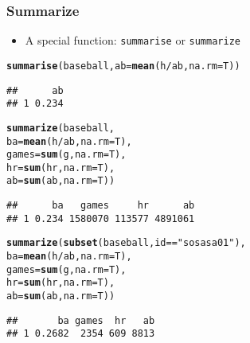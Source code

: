 \documentclass{beamer}\usepackage[]{graphicx}\usepackage[]{color}
\makeatletter
\newcommand{\hlstr}[1]{\textcolor[rgb]{0.192,0.494,0.8}{#1}}%
\newcommand{\hlopt}[1]{\textcolor[rgb]{0,0,0}{#1}}%
\newcommand{\hlstd}[1]{\textcolor[rgb]{0.345,0.345,0.345}{#1}}%
\newcommand{\hlkwc}[1]{\textcolor[rgb]{0.333,0.667,0.333}{#1}}%
\newcommand{\hlkwd}[1]{\textcolor[rgb]{0.737,0.353,0.396}{\textbf{#1}}}%
\newenvironment{kframe}{%
 \def\at@end@of@kframe{}%
 \ifinner\ifhmode%
  \def\at@end@of@kframe{\end{minipage}}%
  \begin{minipage}{\columnwidth}%
 \fi\fi%
 \def\FrameCommand##1{\hskip\@totalleftmargin \hskip-\fboxsep
 \colorbox{shadecolor}{##1}\hskip-\fboxsep
     \hskip-\linewidth \hskip-\@totalleftmargin \hskip\columnwidth}%
 \MakeFramed {\advance\hsize-\width
   \@totalleftmargin\z@ \linewidth\hsize
   \@setminipage}}%
 {\par\unskip\endMakeFramed%
 \at@end@of@kframe}
\newenvironment{knitrout}{}{} %
\makeatother
\begin{document}
\begin{frame}[fragile]
\frametitle{Summarize}
\begin{itemize}
\item A special function: \texttt{summarise} or \texttt{summarize}
\end{itemize}
\begin{knitrout}\scriptsize
{}\color{fgcolor}\begin{kframe}
\begin{alltt}
\hlkwd{summarise}\hlstd{(baseball,} \hlkwc{ab}\hlstd{=}\hlkwd{mean}\hlstd{(h}\hlopt{/}\hlstd{ab,} \hlkwc{na.rm}\hlstd{=T))}
\end{alltt}
\begin{verbatim}
##      ab
## 1 0.234
\end{verbatim}
\begin{alltt}
\hlkwd{summarize}\hlstd{(baseball,}
          \hlkwc{ba} \hlstd{=} \hlkwd{mean}\hlstd{(h}\hlopt{/}\hlstd{ab,} \hlkwc{na.rm}\hlstd{=T),}
          \hlkwc{games} \hlstd{=} \hlkwd{sum}\hlstd{(g,} \hlkwc{na.rm}\hlstd{=T),}
          \hlkwc{hr} \hlstd{=} \hlkwd{sum}\hlstd{(hr,} \hlkwc{na.rm}\hlstd{=T),}
          \hlkwc{ab} \hlstd{=} \hlkwd{sum}\hlstd{(ab,} \hlkwc{na.rm}\hlstd{=T))}
\end{alltt}
\begin{verbatim}
##      ba   games     hr      ab
## 1 0.234 1580070 113577 4891061
\end{verbatim}
\begin{alltt}
\hlkwd{summarize}\hlstd{(}\hlkwd{subset}\hlstd{(baseball, id}\hlopt{==}\hlstr{"sosasa01"}\hlstd{),}
          \hlkwc{ba} \hlstd{=} \hlkwd{mean}\hlstd{(h}\hlopt{/}\hlstd{ab,} \hlkwc{na.rm}\hlstd{=T),}
          \hlkwc{games} \hlstd{=} \hlkwd{sum}\hlstd{(g,} \hlkwc{na.rm}\hlstd{=T),}
          \hlkwc{hr} \hlstd{=} \hlkwd{sum}\hlstd{(hr,} \hlkwc{na.rm}\hlstd{=T),}
          \hlkwc{ab} \hlstd{=} \hlkwd{sum}\hlstd{(ab,} \hlkwc{na.rm}\hlstd{=T))}
\end{alltt}
\begin{verbatim}
##       ba games  hr   ab
## 1 0.2682  2354 609 8813
\end{verbatim}
\end{kframe}
\end{knitrout}
\end{frame}
\end{document}
